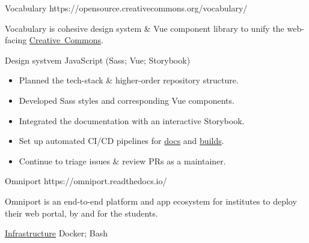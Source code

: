 

\projectsubsection
  {Vocabulary}
  {}
  {https://opensource.creativecommons.org/vocabulary/}

\begin{sectiondescription}
  Vocabulary is cohesive design system \& Vue component library to unify the
  web-facing \href{https://creativecommons.org/}{Creative~Commons}.
\end{sectiondescription}

\projectsubsubsection
  {Design systvem}
  {JavaScript (Sass; Vue; Storybook)}

\begin{sectiondescription}
  \begin{itemize}[nosep, leftmargin = *]
    \item Planned the tech-stack \& higher-order repository structure.
    \item Developed Sass styles and corresponding Vue components.
    \item Integrated the documentation with an interactive Storybook.
    \item Set up automated CI/CD pipelines for \href{https://opensource.creativecommons.org/vocabulary/}{docs} and \href{https://www.npmjs.com/package/@creativecommons/vocabulary}{builds}.
    \item Continue to triage issues \& review PRs as a maintainer.
  \end{itemize}
\end{sectiondescription}


\projectsubsection
  {Omniport}
  {}
  {https://omniport.readthedocs.io/}

\begin{sectiondescription}
  Omniport is an end-to-end platform and app ecosystem for institutes to deploy
  their web portal, by and for the students.
\end{sectiondescription}

\projectsubsubsection
  {\href{https://github.com/IMGIITRoorkee/omniport-docker/}{Infrastructure}}
  {Docker; Bash}

